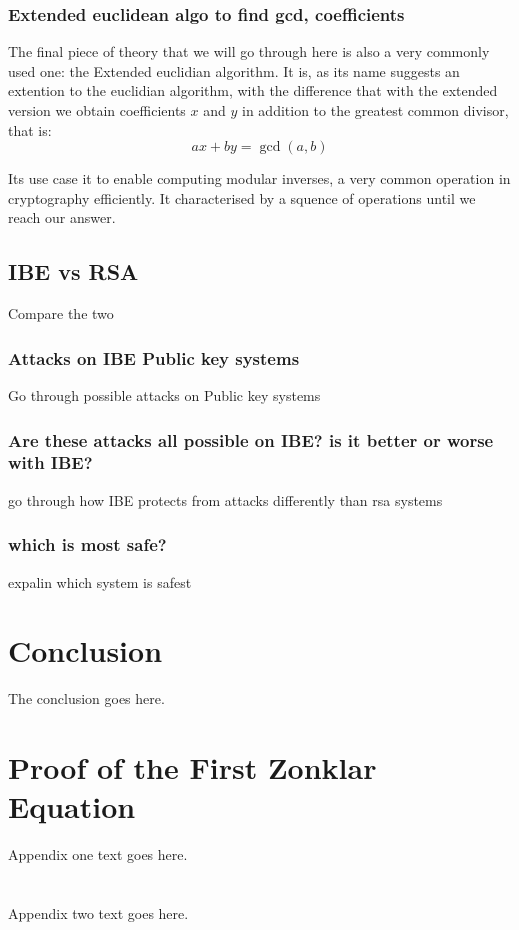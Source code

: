 \documentclass[conference]{IEEEtran}
\begin{document}
\subsubsection{Extended euclidean algo to find gcd, coefficients}
The final piece of theory that we will go through here is also a very
commonly used one: the Extended euclidian algorithm. It is, 
as its name suggests an extention to the euclidian algorithm, with 
the difference that with the extended version we obtain coefficients 
$x$ and $y$ in addition to the greatest common divisor, that is:
\begin{equation*}
    ax + by = \gcd(a,b)
\end{equation*}

Its use case it to enable computing modular inverses, a very common operation in 
cryptography efficiently. It characterised by a squence of operations until we reach
our answer.


\subsection{IBE vs RSA}
Compare the two

\subsubsection{Attacks on IBE Public key systems}
Go through possible attacks on Public key systems

\subsubsection{Are these attacks all possible on IBE? is it better or worse with IBE?}
go through how IBE protects from attacks differently than rsa systems

\subsubsection{which is most safe?}
expalin which system is safest

\section{Conclusion}
The conclusion goes here.

\appendices
\section{Proof of the First Zonklar Equation}
Appendix one text goes here.

\section{}
Appendix two text goes here.
\end{document}
